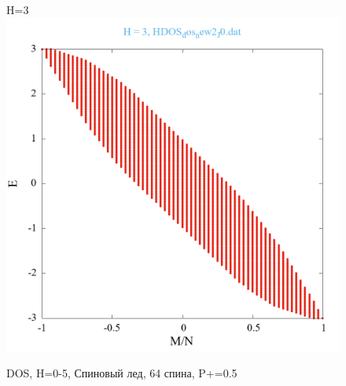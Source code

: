 \documentclass[utf8, babel, sor, jor, amsmath, amssymb, reprint]{elsarticle} %
\begin{document}
\begin{figure}[H]
\begin{minipage}[h]{0.45\linewidth}
	\end{minipage}
	\vfill
	\begin{minipage}[h]{0.45\linewidth}
		\centering H=3
		\includegraphics[width=1\linewidth]{pictures/HDOS_SI_64_J0_H3.png}
	\end{minipage}
	\caption{DOS, H=0-5, Спиновый лед, 64 спина, P+=0.5}
	\label{fig:HDOS_ice}
\end{figure}
\end{document}
